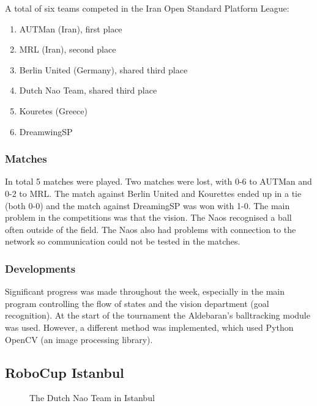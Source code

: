 \documentclass[11pt,a4paper,oneside]{article}
\begin{document}
A total of six teams competed in the Iran Open Standard Platform League:
\begin{enumerate}
\item AUTMan (Iran), first place
\item MRL (Iran), second place
\item Berlin United (Germany), shared third place
\item Dutch Nao Team, shared third place
\item Kouretes (Greece)
\item DreamwingSP
\end{enumerate}

\subsubsection{Matches}
In total 5 matches were played. Two matches were lost, with 0-6 to AUTMan and 0-2 to MRL. The match against Berlin United and Kourettes ended up in a tie (both 0-0) and the match against DreamingSP was won with 1-0.
The main problem in the competitions was that the vision. The Naos recognised a ball often outside of the field. The Naos also had problems with connection to the network so communication could not be tested in the matches.


\subsubsection{Developments}

Significant progress was made throughout the week, especially in the main program controlling the flow of states and the vision department (goal recognition). At the start of the tournament the Aldebaran's balltracking module was used. However, a different method was implemented, which used Python OpenCV (an image processing library).

\subsection{RoboCup Istanbul}
\begin{figure}[htb]    	
\centering
{}
\caption{The Dutch Nao Team in Istanbul}
\label{fig:TeamPhotoIstanbul}
\end{figure}
\end{document}
